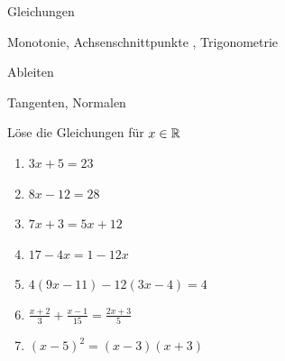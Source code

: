 



\begin{inhalt}
  \item Gleichungen 
  \item Monotonie, Achsenschnittpunkte , Trigonometrie 
	\item Ableiten 
	\item Tangenten, Normalen 
\end{inhalt}



 Löse die Gleichungen für $x\in \mathbb{R}$
\begin{multicols}{2}
  \begin{enumerate}
    \item $3x + 5 = 23$
    \item $8x - 12 = 28$
    \item $7x + 3 = 5x + 12$
		\item $17-4x=1-12x$
    \item $4(9x - 11) - 12(3x - 4) = 4$
    \item $\frac{x+2}{3} + \frac{x-1}{15} = \frac{2x+3}{5}$
		\item $(x-5)^2=(x-3)(x+3)$
  \end{enumerate}
\end{multicols}

